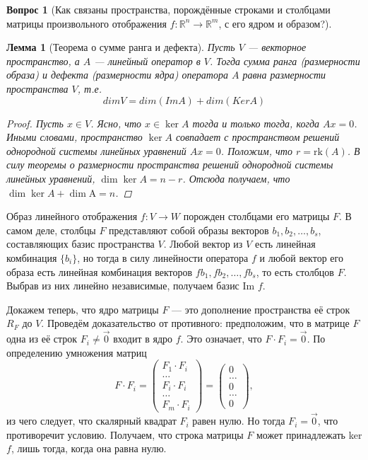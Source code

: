 \documentclass[a4paper,11pt]{article}
\newtheorem*{lemma}{Лемма}
\theoremstyle{remark}
\theoremstyle{definition}
\newtheorem{question}{Вопрос}
\numberwithin{question}{subsection}
\begin{document}
\begin{question}[Как связаны пространства, порождённые строками и столбцами матрицы произвольного отображения \(f: \mathbb{R}^n \rightarrow \mathbb{R}^m\), с его ядром и образом?]
\begin{lemma}[Теорема о сумме ранга и дефекта]
Пусть \(V\) --- векторное пространство, а \(A\) --- линейный оператор в \(V\). Тогда сумма ранга (размерности образа) и дефекта (размерности ядра) оператора \(A\) равна размерности пространства \(V\), т.е.
\begin{equation*}
	dimV = dim(ImA) + dim(KerA)
\end{equation*}

\begin{proof}
Пусть \(x \in V\). Ясно, что \(x \in \ker A\) тогда и только тогда, когда \(Ax = 0\). Иными словами, пространство \(\ker A\) совпадает с пространством решений однородной системы линейных уравнений \(Ax = 0\). Положим, что \(r = \mathrm{rk}(A)\). В силу теоремы о размерности пространства решений однородной системы линейных уравнений, \(\dim \ker A = n - r\). Отсюда получаем, что \(\dim \ker A + \dim \mathrm{A} = n\).
\end{proof}
\end{lemma}


Образ линейного отображения \(f: V \rightarrow W\) порожден столбцами его матрицы \(F\). В самом деле, столбцы \(F\) представляют собой образы векторов \(b_1, b_2, \dots, b_s\), составляющих базис пространства \(V\). Любой вектор из \(V\) есть линейная комбинация \(\{b_i\}\), но тогда в силу линейности оператора \(f\) и любой вектор его образа есть линейная комбинация векторов \(fb_1, fb_2, \dots, fb_s\), то есть столбцов \(F\). Выбрав из них линейно независимые, получаем базис Im \(f\).

Докажем теперь, что ядро матрицы \(F\) --- это дополнение пространства её строк \(R_F\) до \(V\). Проведём доказательство от противного: предположим, что в матрице \(F\) одна из её строк \(F_i \neq \vec{0}\) входит в ядро \(f\). Это означает, что \(F \cdot F_i = \vec{0}\). По определению умножения матриц
\begin{equation*}
	F \cdot F_i =
	\begin{pmatrix}
		F_1 \cdot F_i \\
		\dots \\
		F_i \cdot F_i \\
		\dots \\
		F_m \cdot F_i
	\end{pmatrix} = 
	\begin{pmatrix}
		0 \\
		\dots \\
		0 \\
		\dots \\
		0
	\end{pmatrix},
\end{equation*}
из чего следует, что скалярный квадрат \(F_i\) равен нулю. Но тогда \(F_i = \vec{0}\), что противоречит условию. Получаем, что строка матрицы \(F\) может принадлежать ker \(f\), лишь тогда, когда она равна нулю.


\end{question}
\end{document}
